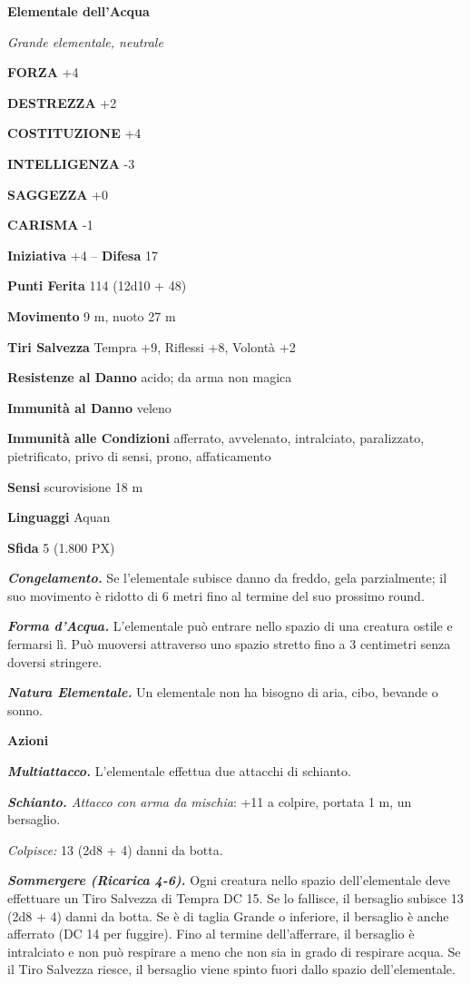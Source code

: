 \begin{multicols}{2}
	\medskip{}\textbf{Elementale dell'Acqua}

	\textit{Grande elementale, neutrale}

	\textbf{FORZA} +4

	\textbf{DESTREZZA} +2

	\textbf{COSTITUZIONE} +4

	\textbf{INTELLIGENZA} -3

	\textbf{SAGGEZZA} +0

	\textbf{CARISMA} -1

	\textbf{Iniziativa} +4 -- \textbf{Difesa} 17

	\textbf{Punti Ferita} 114 (12d10 + 48)

	\textbf{Movimento} 9 m, nuoto 27 m

	\textbf{Tiri Salvezza} Tempra +9, Riflessi +8, Volontà +2

	\textbf{Resistenze al Danno} acido; da arma non magica

	\textbf{Immunità al Danno} veleno

	\textbf{Immunità alle Condizioni} afferrato, avvelenato, intralciato, paralizzato, pietrificato, privo di sensi, prono, affaticamento

	\textbf{Sensi} scurovisione 18 m

	\textbf{Linguaggi} Aquan

	\textbf{Sfida} 5 (1.800 PX)

	\textit{\textbf{Congelamento.}} Se l'elementale subisce danno da freddo, gela parzialmente; il suo movimento è ridotto di 6 metri fino al termine del suo prossimo round.

	\textit{\textbf{Forma d'Acqua.}} L'elementale può entrare nello spazio di una creatura ostile e fermarsi lì. Può muoversi attraverso uno spazio stretto fino a 3 centimetri senza doversi stringere.

	\textit{\textbf{Natura Elementale.}} Un elementale non ha bisogno di aria,
	cibo, bevande o sonno.

	\textbf{Azioni}

	\textit{\textbf{Multiattacco.}} L'elementale effettua due attacchi di schianto.

	\textit{\textbf{Schianto.} Attacco con arma da mischia}: +11 a colpire, portata 1 m, un bersaglio.

	\textit{Colpisce:} 13 (2d8 + 4) danni da botta.

	\textit{\textbf{Sommergere (Ricarica 4-6).}} Ogni creatura nello spazio dell'elementale deve effettuare un Tiro Salvezza di Tempra DC 15. Se lo fallisce, il bersaglio subisce 13 (2d8 + 4) danni da botta. Se è di taglia Grande o inferiore, il bersaglio è anche afferrato (DC 14 per fuggire). Fino al termine dell'afferrare, il bersaglio è intralciato e non può respirare a meno che non sia in grado di respirare acqua. Se il Tiro Salvezza riesce, il bersaglio viene spinto fuori dallo spazio
	dell'elementale.


\end{multicols}
